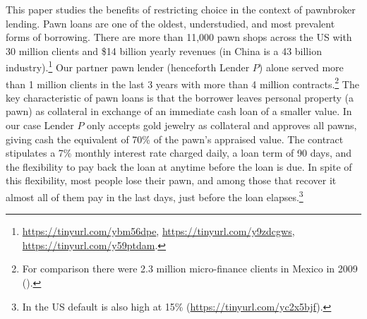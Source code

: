 \documentclass[oneside,11pt]{article}
\begin{document}
This paper studies the benefits of restricting choice in the context of pawnbroker lending. Pawn loans are one of the oldest, understudied, and most prevalent forms of borrowing. There are more than 11,000 pawn shops across the US with 30 million clients and \$14 billion yearly revenues (in China is a 43 billion industry).\footnote{\url{https://tinyurl.com/ybm56dpe}, \url{https://tinyurl.com/y9zdcgws}, \url{https://tinyurl.com/y59ptdam}.} Our partner pawn lender (henceforth Lender $P$) alone served more than 1 million clients in the last 3 years with more than 4 million contracts.\footnote{For comparison there were 2.3 million micro-finance clients in Mexico in 2009 (\cite{Pedroza:2010}).} The key characteristic of pawn loans is that the borrower leaves personal property (a pawn) as collateral in exchange of an immediate cash loan of a smaller value. In our case Lender $P$ only accepts gold jewelry as collateral and approves all pawns, giving cash the equivalent of 70\% of the pawn's appraised value. The contract stipulates a 7\% monthly interest rate charged daily, a loan term of 90 days, and the flexibility to pay back the loan at anytime before the loan is due. In spite of this flexibility, most people lose their pawn, and among those that recover it almost all of them pay in the last days, just before the loan elapses.\footnote{In the US default is also high at 15\% (\url{https://tinyurl.com/yc2x5bjf}).}




\end{document}
